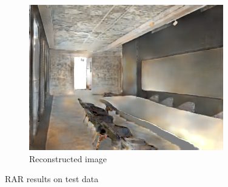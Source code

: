 \begin{figure}[H]
\begin{subfigure}{0.32\linewidth}
        \includegraphics[width=\linewidth]{praca/images/AI47_007_Cam07.VRayLightSelect_RE_L8.reconstructed.png}
        \caption{Reconstructed image}
    \end{subfigure}
    \caption[RAR results - test data]{RAR results on test data}
    \label{fig:rar-test}
\end{figure}
